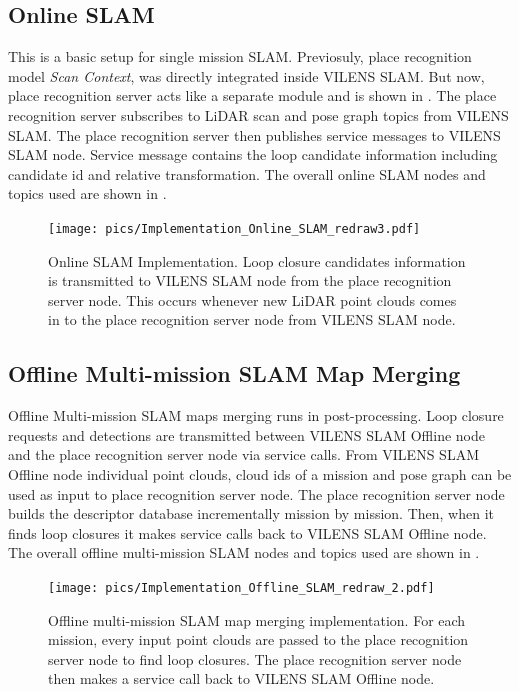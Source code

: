 \subsection{Online SLAM}
This is a basic setup for single mission SLAM. Previosuly, place recognition model \emph{Scan Context}, was directly integrated inside VILENS SLAM. But now, place recognition server acts like a separate module and is shown in . The place recognition server subscribes to LiDAR scan and pose graph topics from VILENS SLAM. The place recognition server then publishes service messages to VILENS SLAM node. Service message contains the loop candidate information including candidate id and relative transformation. The overall online SLAM nodes and topics used are shown in . 

\begin{figure}[htbp]
  \centering
  \texttt{[image: pics/Implementation\_Online\_SLAM\_redraw3.pdf]}
  \caption{Online SLAM Implementation. Loop closure candidates information is transmitted to VILENS SLAM node from the place recognition server node. This occurs whenever new LiDAR point clouds comes in to the place recognition server node from VILENS SLAM node. }
  \label{fig:implementation_online_slam}
\end{figure}


\subsection{Offline Multi-mission SLAM Map Merging}
Offline Multi-mission SLAM maps merging runs in post-processing. Loop closure requests and detections are transmitted between VILENS SLAM Offline node and the place recognition server node via service calls. From VILENS SLAM Offline node individual point clouds, cloud ids of a mission and pose graph can be used as input to place recognition server node. The place recognition server node builds the descriptor database incrementally mission by mission. Then, when it finds loop closures it makes service calls back to VILENS SLAM Offline node. The overall offline multi-mission SLAM nodes and topics used are shown in .  

\begin{figure}[htbp]
  \centering
  \texttt{[image: pics/Implementation\_Offline\_SLAM\_redraw\_2.pdf]}
  \caption{Offline multi-mission SLAM map merging implementation. For each mission, every input point clouds are passed to the place recognition server node to find loop closures. The place recognition server node then makes a service call back to VILENS SLAM Offline node.}
  \label{fig:implementation_offline_slam}
\end{figure}



